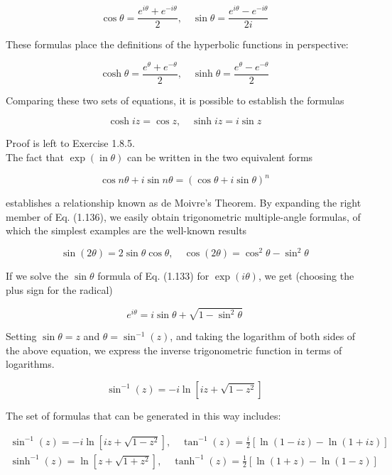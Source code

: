 \documentclass[10pt]{article}
\begin{document}
\begin{equation*}
\cos \theta=\frac{e^{i \theta}+e^{-i \theta}}{2}, \quad \sin \theta=\frac{e^{i \theta}-e^{-i \theta}}{2 i} \tag{1.133}
\end{equation*}


These formulas place the definitions of the hyperbolic functions in perspective:


\begin{equation*}
\cosh \theta=\frac{e^{\theta}+e^{-\theta}}{2}, \quad \sinh \theta=\frac{e^{\theta}-e^{-\theta}}{2} \tag{1.134}
\end{equation*}


Comparing these two sets of equations, it is possible to establish the formulas


\begin{equation*}
\cosh i z=\cos z, \quad \sinh i z=i \sin z \tag{1.135}
\end{equation*}


Proof is left to Exercise 1.8.5.\\
The fact that $\exp (\operatorname{in} \theta)$ can be written in the two equivalent forms


\begin{equation*}
\cos n \theta+i \sin n \theta=(\cos \theta+i \sin \theta)^{n} \tag{1.136}
\end{equation*}


establishes a relationship known as de Moivre's Theorem. By expanding the right member of Eq. (1.136), we easily obtain trigonometric multiple-angle formulas, of which the simplest examples are the well-known results

$$
\sin (2 \theta)=2 \sin \theta \cos \theta, \quad \cos (2 \theta)=\cos ^{2} \theta-\sin ^{2} \theta
$$

If we solve the $\sin \theta$ formula of Eq. (1.133) for $\exp (i \theta)$, we get (choosing the plus sign for the radical)

$$
e^{i \theta}=i \sin \theta+\sqrt{1-\sin ^{2} \theta}
$$

Setting $\sin \theta=z$ and $\theta=\sin ^{-1}(z)$, and taking the logarithm of both sides of the above equation, we express the inverse trigonometric function in terms of logarithms.

$$
\sin ^{-1}(z)=-i \ln \left[i z+\sqrt{1-z^{2}}\right]
$$

The set of formulas that can be generated in this way includes:

\[
\begin{array}{cc}
\sin ^{-1}(z)=-i \ln \left[i z+\sqrt{1-z^{2}}\right], \quad \tan ^{-1}(z)=\frac{i}{2}[\ln (1-i z)-\ln (1+i z)] \\
\sinh ^{-1}(z)=\ln \left[z+\sqrt{1+z^{2}}\right], \quad \tanh ^{-1}(z)=\frac{1}{2}[\ln (1+z)-\ln (1-z)] \tag{1.137}
\end{array}
\]
\end{document}
